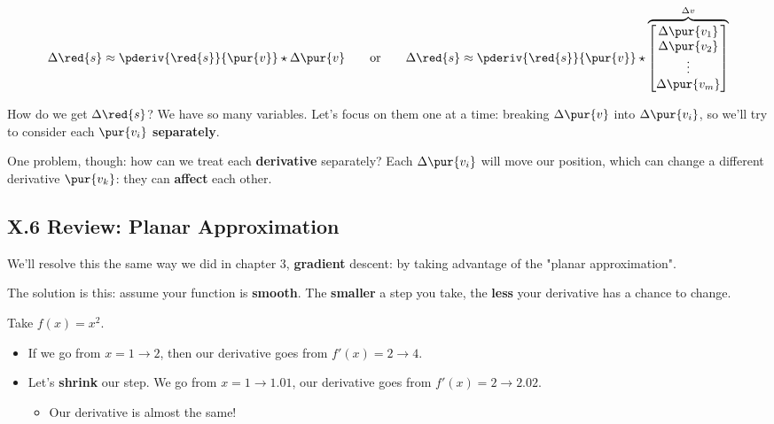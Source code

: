         \begin{equation}
            \Delta \red{s}
            \approx
            \pderiv{\red{s}}{ \pur{v} }  
            \star
            \Delta \pur{v}
                \qquad
                \text{or}
                \qquad
            \Delta \red{s}
            \approx
            \pderiv{\red{s}}{ \pur{v} } 
            \star
            \overbrace{
                \begin{bmatrix}
                    \Delta \pur{v_1}\\ \Delta \pur{v_2}\\ \vdots \\ \Delta \pur{v_m}
                \end{bmatrix}
            }^{\Delta v}
        \end{equation}
        
        How do we get $\Delta \red{s}$? We have so many variables. Let's focus on them one at a time: breaking $\Delta \pur{v}$ into $\Delta \pur{v_i}$, so we'll try to consider each $\pur{v_i}$ \textbf{separately}.
        
        One problem, though: how can we treat each \textbf{derivative} separately? Each $\Delta \pur{v_i}$ will move our position, which can change a different derivative $\pur{v_k}$: they can \textbf{affect} each other.
    
    \secdiv
    
    \subsection*{X.6 \quad Review: Planar Approximation}
        
        We'll resolve this the same way we did in chapter 3, \textbf{gradient} descent: by taking advantage of the "planar approximation".
        
        The solution is this: assume your function is \textbf{smooth}. The \textbf{smaller} a step you take, the \textbf{less} your derivative has a chance to change.
        
        \miniex Take $f(x)=x^2$. 
        
        \begin{itemize}
            \item If we go from $x=1\rightarrow2$, then our derivative goes from $f'(x)=2 \rightarrow 4$.
            
            \item Let's \textbf{shrink} our step. We go from $x=1\rightarrow1.01$, our derivative goes from $f'(x)=2 \rightarrow 2.02$.
                \begin{itemize}
                    \item Our derivative is almost the same!
                \end{itemize}
        \end{itemize}
        
